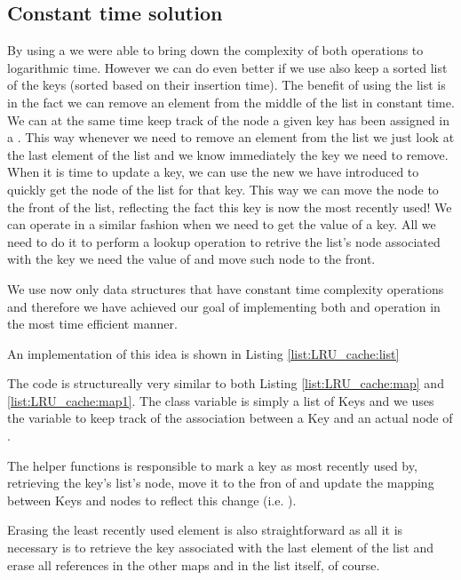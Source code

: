\subsection{Constant time solution}
\label{LRU_cache:sec:constanttime}
By using a  we were able to bring down the complexity of both operations to logarithmic time. However we can do even better if we use also keep a sorted list of the keys (sorted based on their insertion time).
The benefit of using the list is in the fact we can  remove an element from the middle of the list in constant time.
We can at the same time keep track of the node a given key has been assigned in a . This way whenever we need to remove an element from the list we just look at the last element of the list and we know immediately the key we need to remove.
When it is time to update a key, we can use the new  we have introduced to quickly get the node of the list for that key. This way we can move the node to the front of the list, reflecting the fact this key is now the most recently used!
We can operate in a similar fashion when we need to get the value of a key. All we need to do it to perform a lookup operation to retrive the list's node associated with the key we need the value of and move such node to the front.

We use now only data structures that have constant time complexity operations and therefore we have achieved our goal of implementing both  and  operation in the most time efficient manner.

An implementation of this idea is shown in Listing \ref{list:LRU_cache:list}




The code is structureally very similar to both Listing \ref{list:LRU_cache:map} and \ref{list:LRU_cache:map1}.
The class variable  is simply a list of Keys and we uses  the variable  to keep track of the association between a Key and an actual node of .

The helper functions  is responsible to mark a key as most recently used by, retrieving the key's list's node, move it to the fron of  and update the mapping between Keys and nodes to reflect this change (i.e. ).

Erasing the least recently used element is also straightforward as all it is necessary is to retrieve the key associated with the last element of the list  and erase all references in the other maps and in the list itself, of course.
